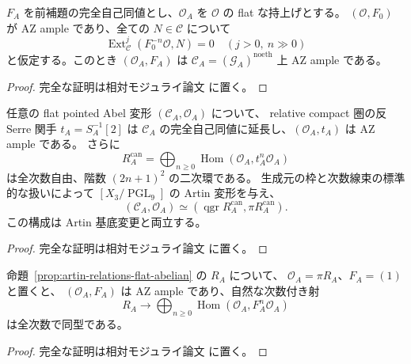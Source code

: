 \begin{lemma}
\label{lem:artin-ample-lift}
$F_A$ を前補題の完全自己同値とし、$\mathcal O_A$ を $\mathcal O$ の flat な持上げとする。
$(\mathcal O,F_0)$ が AZ ample であり、全ての $N\in\mathcal C$ について
\[
 \operatorname{Ext}^{j}_{\mathcal C}(F_0^{-n}\mathcal O,N)=0
 \quad(j>0,\ n\gg0)
\]
と仮定する。このとき $(\mathcal O_A,F_A)$ は
$\mathcal C_A=(\mathcal G_A)^{\mathrm{noeth}}$ 上 AZ ample である。
\end{lemma}
\begin{proof}
完全な証明は相対モジュライ論文 \cite[\texttt{artin_foundation}]{QuadricModuli2026} に置く。
\end{proof}

\begin{proposition}
\label{prop:artin-canonical-antiserre}
任意の flat pointed Abel 変形 $(\mathcal C_A,\mathcal O_A)$ について、
relative compact 圏の反 Serre 関手 $t_A=S_A^{-1}[2]$ は
$\mathcal C_A$ の完全自己同値に延長し、$(\mathcal O_A,t_A)$ は AZ ample である。
さらに
\[
 R_A^{\mathrm{can}}
 =\bigoplus_{n\ge0}\operatorname{Hom}(\mathcal O_A,t_A^n\mathcal O_A)
\]
は全次数自由、階数 $(2n+1)^2$ の二次環である。
生成元の枠と次数線束の標準的な扱いによって $[X_3/\operatorname{PGL}_9]$ の
Artin 変形を与え、
\[
 (\mathcal C_A,\mathcal O_A)
 \simeq(\operatorname{qgr}R_A^{\mathrm{can}},\pi R_A^{\mathrm{can}}).
\]
この構成は Artin 基底変更と両立する。
\end{proposition}
\begin{proof}
完全な証明は相対モジュライ論文 \cite[\texttt{artin_foundation}]{QuadricModuli2026} に置く。
\end{proof}

\begin{proposition}
\label{prop:artin-presentation-full-orbit}
命題~\ref{prop:artin-relations-flat-abelian} の $R_A$ について、
$\mathcal O_A=\pi R_A$、$F_A=(1)$ と置くと、
$(\mathcal O_A,F_A)$ は AZ ample であり、自然な次数付き射
\[
 R_A\longrightarrow
 \bigoplus_{n\ge0}\operatorname{Hom}(\mathcal O_A,F_A^n\mathcal O_A)
\]
は全次数で同型である。
\end{proposition}
\begin{proof}
完全な証明は相対モジュライ論文 \cite[\texttt{artin_foundation}]{QuadricModuli2026} に置く。
\end{proof}

